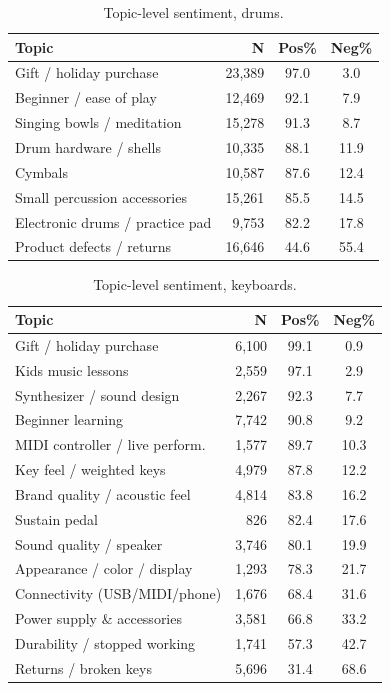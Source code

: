 \documentclass[11pt]{article}
\begin{document}
\begin{table}[h]
\centering
\small
\setlength{\tabcolsep}{4pt}
\caption{Topic-level sentiment, drums.}
\label{tab:topics_drums}
\begin{tabular}{lrcc}
\toprule
\textbf{Topic} & \textbf{N} & \textbf{Pos\%} & \textbf{Neg\%} \\
\midrule
Gift / holiday purchase           & 23{,}389 & 97.0 &  3.0 \\
Beginner / ease of play           & 12{,}469 & 92.1 &  7.9 \\
Singing bowls / meditation        & 15{,}278 & 91.3 &  8.7 \\
Drum hardware / shells            & 10{,}335 & 88.1 & 11.9 \\
Cymbals                           & 10{,}587 & 87.6 & 12.4 \\
Small percussion accessories      & 15{,}261 & 85.5 & 14.5 \\
Electronic drums / practice pad   &  9{,}753 & 82.2 & 17.8 \\
Product defects / returns         & 16{,}646 & 44.6 & 55.4 \\
\bottomrule
\end{tabular}
\end{table}

\begin{table}[h]
\centering
\small
\setlength{\tabcolsep}{4pt}
\caption{Topic-level sentiment, keyboards.}
\label{tab:topics_keyboards}
\begin{tabular}{lrcc}
\toprule
\textbf{Topic} & \textbf{N} & \textbf{Pos\%} & \textbf{Neg\%} \\
\midrule
Gift / holiday purchase           & 6{,}100 & 99.1 &  0.9 \\
Kids music lessons                & 2{,}559 & 97.1 &  2.9 \\
Synthesizer / sound design        & 2{,}267 & 92.3 &  7.7 \\
Beginner learning                 & 7{,}742 & 90.8 &  9.2 \\
MIDI controller / live perform.\  & 1{,}577 & 89.7 & 10.3 \\
Key feel / weighted keys          & 4{,}979 & 87.8 & 12.2 \\
Brand quality / acoustic feel     & 4{,}814 & 83.8 & 16.2 \\
Sustain pedal                     &   826   & 82.4 & 17.6 \\
Sound quality / speaker           & 3{,}746 & 80.1 & 19.9 \\
Appearance / color / display      & 1{,}293 & 78.3 & 21.7 \\
Connectivity (USB/MIDI/phone)     & 1{,}676 & 68.4 & 31.6 \\
Power supply \& accessories       & 3{,}581 & 66.8 & 33.2 \\
Durability / stopped working      & 1{,}741 & 57.3 & 42.7 \\
Returns / broken keys             & 5{,}696 & 31.4 & 68.6 \\
\bottomrule
\end{tabular}
\end{table}
\end{document}
